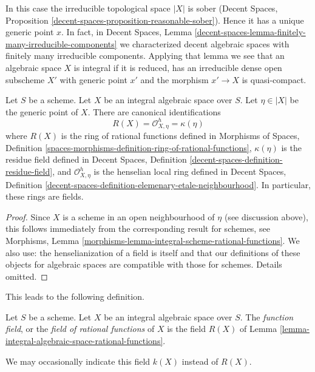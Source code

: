 \noindent
In this case the irreducible topological space $|X|$ is sober
(Decent Spaces, Proposition \ref{decent-spaces-proposition-reasonable-sober}).
Hence it has a unique generic point $x$. In fact, in
Decent Spaces, Lemma
\ref{decent-spaces-lemma-finitely-many-irreducible-components}
we characterized decent algebraic spaces with finitely many
irreducible components. Applying that lemma we see that an
algebraic space $X$ is integral if it is
reduced, has an irreducible dense open subscheme $X'$
with generic point $x'$ and the morphism $x' \to X$ is quasi-compact.

\begin{lemma}
\label{lemma-integral-algebraic-space-rational-functions}
Let $S$ be a scheme. Let $X$ be an integral algebraic space over $S$.
Let $\eta \in |X|$ be the generic point of $X$.
There are canonical identifications
$$
R(X) = \mathcal{O}_{X, \eta}^h = \kappa(\eta)
$$
where $R(X)$ is the ring of rational functions defined in
Morphisms of Spaces, Definition
\ref{spaces-morphisms-definition-ring-of-rational-functions},
$\kappa(\eta)$ is the residue field defined in
Decent Spaces, Definition \ref{decent-spaces-definition-residue-field},
and $\mathcal{O}_{X, \eta}^h$ is the henselian local ring defined in
Decent Spaces, Definition
\ref{decent-spaces-definition-elemenary-etale-neighbourhood}.
In particular, these rings are fields.
\end{lemma}

\begin{proof}
Since $X$ is a scheme in an open neighbourhood of $\eta$ (see discussion
above), this follows immediately from the corresponding result for
schemes, see Morphisms, Lemma
\ref{morphisms-lemma-integral-scheme-rational-functions}.
We also use: the henselianization of a field is itself
and that our definitions of these objects
for algebraic spaces are compatible with those for schemes.
Details omitted.
\end{proof}

\noindent
This leads to the following definition.

\begin{definition}
\label{definition-function-field}
Let $S$ be a scheme. Let $X$ be an integral algebraic space over $S$.
The {\it function field}, or the {\it field of rational functions}
of $X$ is the field $R(X)$ of
Lemma \ref{lemma-integral-algebraic-space-rational-functions}.
\end{definition}

\noindent
We may occasionally indicate this field $k(X)$ instead of $R(X)$.

